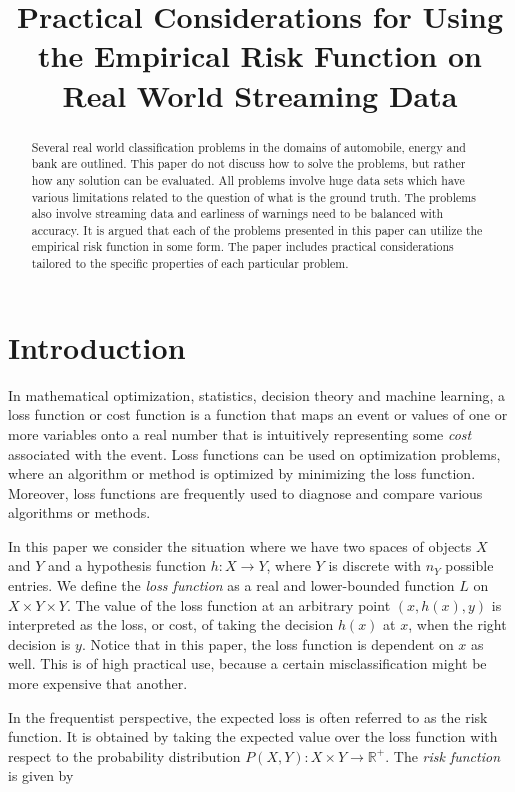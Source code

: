 \documentclass{article}
\title{Practical Considerations for Using the Empirical Risk Function on Real World Streaming Data}
\date{}
\theoremstyle{theorem}
\theoremstyle{definition}
\begin{document}
\maketitle

\begin{abstract}
Several real world classification problems in the domains of automobile, energy and bank are outlined.  This paper do not discuss how to solve the problems, but rather how any solution can be evaluated.  All problems involve huge data sets which have various limitations related to the question of what is the ground truth. The problems also involve streaming data and earliness of warnings need to be balanced with accuracy.  It is argued that each of the problems presented in this paper can utilize the empirical risk function in some form.  The paper includes practical considerations tailored to the specific properties of each particular problem.
\end{abstract}

\section{Introduction}

In mathematical optimization, statistics, decision theory and machine learning, a loss function or cost function is a function that maps an event or values of one or more variables onto a real number that is intuitively representing some \emph{cost} associated with the event. Loss functions can be used on optimization problems, where an algorithm or method is optimized by minimizing the loss function.  Moreover, loss functions are frequently used to diagnose and compare various algorithms or methods.  

In this paper we consider the situation where we have two spaces of objects $X$ and $Y$ and a hypothesis function $h:X \rightarrow Y$, where $Y$ is discrete with $n_Y$ possible entries.  We define the \emph{loss function} as a real and lower-bounded function $L$ on $X \times Y \times Y$.  The value of the loss function at an arbitrary point $(x, h(x), y)$ is interpreted as the loss, or cost, of taking the decision $h(x)$ at $x$, when the right decision is $y$.  Notice that in this paper, the loss function is dependent on $x$ as well.  This is of high practical use, because a certain misclassification might be more expensive that another. 

In the frequentist perspective, the expected loss is often referred to as the risk function.  It is obtained by taking the expected value over the loss function with respect to the probability distribution $P(X,Y): X\times Y \rightarrow \mathbb{R}^+$.  The \emph{risk function} is given by
\end{document}
